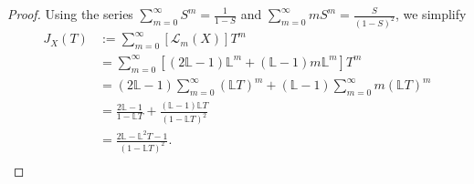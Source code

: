 \documentclass{article}
\begin{document}
\begin{proof}
  Using the series $\displaystyle\sum_{m=0}^\infty S^m =\frac{1}{1-S}$
  and $\displaystyle\sum_{m=0}^\infty mS^m =\frac{S}{(1-S)^2}$, we simplify
  \begin{align*}
    J_X(T) &:=\sum_{m=0}^\infty [\mathcal{L}_m(X)]T^m\\
      &=\sum_{m=0}^\infty [(2\mathbb{L}-1)\mathbb{L}^m
        +(\mathbb{L}-1)m\mathbb{L}^m] T^m\\
      &=(2\mathbb{L}-1) \sum_{m=0}^\infty (\mathbb{L}T)^m +(\mathbb{L}-1)
        \sum_{m=0}^\infty m(\mathbb{L}T)^m\\
      &=\frac{2\mathbb{L}-1}{1-\mathbb{L}T}
        +\frac{(\mathbb{L}-1)\mathbb{L}T}{(1-\mathbb{L}T)^2}\\
      &=\frac{2\mathbb{L}-\mathbb{L}^2T-1}{(1-\mathbb{L}T)^2}.\\
  \end{align*}
\end{proof}
\end{document}
